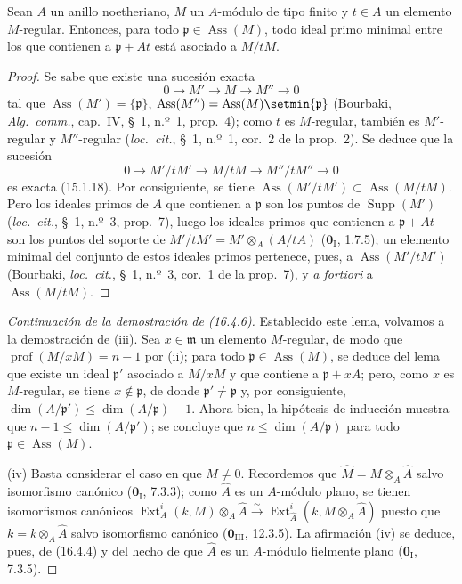 \begin{lemma}[16.4.6.3]
\label{0.16.4.6.3-fr}
Sean $A$ un anillo noetheriano, $M$ un $A$-módulo de tipo finito y $t\in A$ un
elemento $M$-regular. Entonces, para todo
$\mathfrak{p}\in\operatorname{Ass}(M)$, todo ideal primo minimal entre los que
contienen a $\mathfrak{p}+At$ está asociado a $M/tM$.
\end{lemma}

\begin{proof}
Se sabe que existe una sucesión exacta
\[
  0\to M'\to M\to M''\to0
\]
tal que $\operatorname{Ass}(M')=\{\mathfrak{p}\}$,
$\operatorname{Ass}(M'')=\operatorname{Ass}(M)\setmin\{\mathfrak{p}\}$ (Bourbaki,
\emph{Alg.~comm.}, cap.~IV, \S~1, n.º~1, prop.~4); como $t$ es
$M$-regular, también es $M'$-regular y $M''$-regular
(\emph{loc.~cit.}, \S~1, n.º~1, cor.~2 de la prop.~2). Se deduce que la
sucesión
\[
  0\to M'/tM'\to M/tM\to M''/tM''\to0
\]
es exacta (15.1.18). Por consiguiente, se tiene
$\operatorname{Ass}(M'/tM')\subset\operatorname{Ass}(M/tM)$. Pero los ideales
primos de $A$ que contienen a $\mathfrak{p}$ son los puntos de
$\operatorname{Supp}(M')$ (\emph{loc.~cit.}, \S~1, n.º~3, prop.~7), luego los
ideales primos que contienen a $\mathfrak{p}+At$ son los puntos del soporte de
$M'/tM'=M'\otimes_A(A/tA)$ ($\mathbf{0}_{\mathrm I}$, 1.7.5); un elemento minimal del
conjunto de estos ideales primos pertenece, pues, a
$\operatorname{Ass}(M'/tM')$ (Bourbaki, \emph{loc.~cit.}, \S~1, n.º~3,
cor.~1 de la prop.~7), y \emph{a fortiori} a
$\operatorname{Ass}(M/tM)$.
\end{proof}

\begin{proof}[Continuación de la demostración de (16.4.6)]
Establecido este lema, volvamos a la demostración de (iii). Sea
$x\in\mathfrak{m}$ un elemento $M$-regular, de modo que
$\operatorname{prof}(M/xM)=n-1$ por (ii); para todo
$\mathfrak{p}\in\operatorname{Ass}(M)$, se deduce del lema que existe un ideal
$\mathfrak{p}'$ asociado a $M/xM$ y que contiene a $\mathfrak{p}+xA$; pero,
como $x$ es $M$-regular, se tiene $x\notin\mathfrak{p}$, de donde
$\mathfrak{p}'\neq\mathfrak{p}$ y, por consiguiente,
$\dim(A/\mathfrak{p}')\leq\dim(A/\mathfrak{p})-1$. Ahora bien, la hipótesis de
inducción muestra que $n-1\leq\dim(A/\mathfrak{p}')$; se concluye que
$n\leq\dim(A/\mathfrak{p})$ para todo
$\mathfrak{p}\in\operatorname{Ass}(M)$.

(iv) Basta considerar el caso en que $M\neq0$. Recordemos que
$\widehat{M}=M\otimes_A\widehat{A}$ salvo isomorfismo canónico
($\mathbf{0}_{\mathrm I}$, 7.3.3); como $\widehat{A}$ es un $A$-módulo plano, se tienen
isomorfismos canónicos
$\operatorname{Ext}^i_A(k,M)\otimes_A\widehat{A}\xrightarrow{\sim}\operatorname{Ext}^i_{\widehat{A}}(k,M\otimes_A\widehat{A})$
puesto que $k=k\otimes_A\widehat{A}$ salvo isomorfismo canónico
($\mathbf{0}_{\mathrm{III}}$, 12.3.5). La afirmación (iv) se deduce, pues, de (16.4.4) y
del hecho de que $\widehat{A}$ es un $A$-módulo fielmente plano
($\mathbf{0}_{\mathrm I}$, 7.3.5).
\end{proof}

